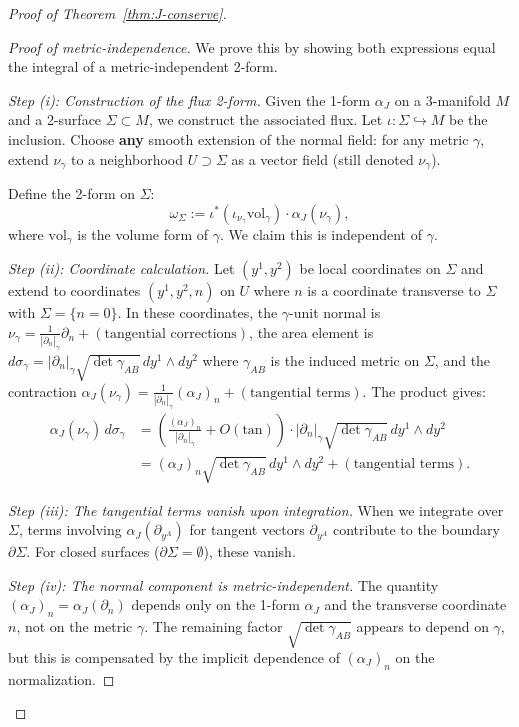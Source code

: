 \documentclass[10pt,a4paper]{amsart}
\begin{document}
\begin{proof}[Proof of Theorem~\ref{thm:J-conserve}]
\begin{proof}[Proof of metric-independence]
We prove this by showing both expressions equal the integral of a metric-independent 2-form.

\textit{Step (i): Construction of the flux 2-form.} Given the 1-form $\alpha_J$ on a 3-manifold $M$ and a 2-surface $\Sigma \subset M$, we construct the associated flux. Let $\iota: \Sigma \hookrightarrow M$ be the inclusion. Choose \textbf{any} smooth extension of the normal field: for any metric $\gamma$, extend $\nu_\gamma$ to a neighborhood $U \supset \Sigma$ as a vector field (still denoted $\nu_\gamma$).

Define the 2-form on $\Sigma$:
\[
\omega_\Sigma := \iota^*(\iota_{\nu_\gamma} \text{vol}_\gamma) \cdot \alpha_J(\nu_\gamma),
\]
where $\text{vol}_\gamma$ is the volume form of $\gamma$. We claim this is independent of $\gamma$.

\textit{Step (ii): Coordinate calculation.} Let $(y^1, y^2)$ be local coordinates on $\Sigma$ and extend to coordinates $(y^1, y^2, n)$ on $U$ where $n$ is a coordinate transverse to $\Sigma$ with $\Sigma = \{n = 0\}$. In these coordinates, the $\gamma$-unit normal is $\nu_\gamma = \frac{1}{|\partial_n|_\gamma}\partial_n + (\text{tangential corrections})$, the area element is $d\sigma_\gamma = |\partial_n|_\gamma \sqrt{\det \gamma_{AB}} \, dy^1 \wedge dy^2$ where $\gamma_{AB}$ is the induced metric on $\Sigma$, and the contraction $\alpha_J(\nu_\gamma) = \frac{1}{|\partial_n|_\gamma}(\alpha_J)_n + (\text{tangential terms})$. The product gives:
\begin{align}
\alpha_J(\nu_\gamma) \, d\sigma_\gamma &= \left(\frac{(\alpha_J)_n}{|\partial_n|_\gamma} + O(\text{tan})\right) \cdot |\partial_n|_\gamma \sqrt{\det \gamma_{AB}} \, dy^1 \wedge dy^2 \\
&= (\alpha_J)_n \sqrt{\det \gamma_{AB}} \, dy^1 \wedge dy^2 + (\text{tangential terms}).
\end{align}

\textit{Step (iii): The tangential terms vanish upon integration.} When we integrate over $\Sigma$, terms involving $\alpha_J(\partial_{y^A})$ for tangent vectors $\partial_{y^A}$ contribute to the boundary $\partial \Sigma$. For closed surfaces ($\partial \Sigma = \emptyset$), these vanish.

\textit{Step (iv): The normal component is metric-independent.} The quantity $(\alpha_J)_n = \alpha_J(\partial_n)$ depends only on the 1-form $\alpha_J$ and the transverse coordinate $n$, not on the metric $\gamma$. The remaining factor $\sqrt{\det \gamma_{AB}}$ appears to depend on $\gamma$, but this is compensated by the implicit dependence of $(\alpha_J)_n$ on the normalization.


\end{proof}
\end{proof}
\end{document}
